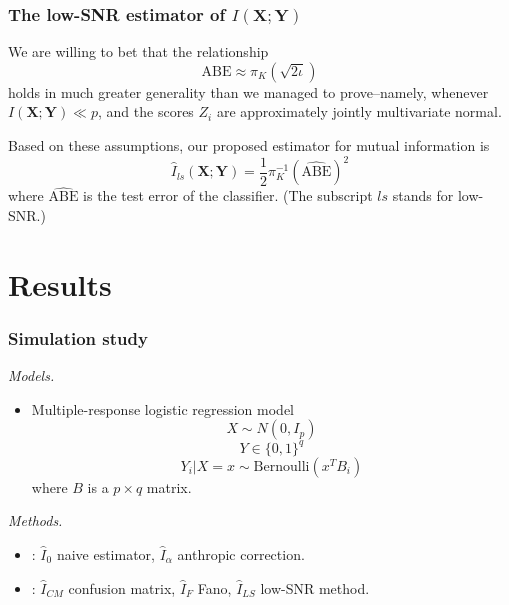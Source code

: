 \documentclass{beamer}
\newcommand{\bX}{\boldsymbol{X}}
\newcommand{\bY}{\boldsymbol{Y}}
\begin{document}
\begin{frame}
\frametitle{The low-SNR estimator of $I(\bX;\bY)$}

We are willing to bet that the relationship 
\[\text{ABE} \approx \pi_K(\sqrt{2\iota})\]
holds in much greater generality than we managed to prove--namely,
whenever $I(\bX; \bY) \ll p$, and the scores $Z_i$ are approximately
jointly multivariate normal.\newline

Based on these assumptions, our proposed estimator for mutual information is
\[
\hat{I}_{ls}(\bX; \bY) = \frac{1}{2}\pi_K^{-1}(\widehat{\text{ABE}})^2
\]
where $\widehat{\text{ABE}}$ is the test error of the classifier.
(The subscript $ls$ stands for low-SNR.)
\end{frame}

\section{Results}

\begin{frame}
\frametitle{Simulation study}
\emph{Models.}
\begin{itemize}
\item Multiple-response logistic regression model
\[
X \sim N(0, I_p)
\]
\[
Y \in \{0,1\}^q
\]
\[
Y_i|X = x \sim \text{Bernoulli}(x^T B_i)
\]
where $B$ is a $p \times q$ matrix.
\end{itemize}

\emph{Methods.}
\begin{itemize}
\item {}: $\hat{I}_0$ naive estimator, $\hat{I}_\alpha$ anthropic correction.
\item {}: $\hat{I}_{CM}$ confusion matrix, $\hat{I}_F$ Fano, $\hat{I}_{LS}$ low-SNR method.
\end{itemize}
\end{frame}
\end{document}
